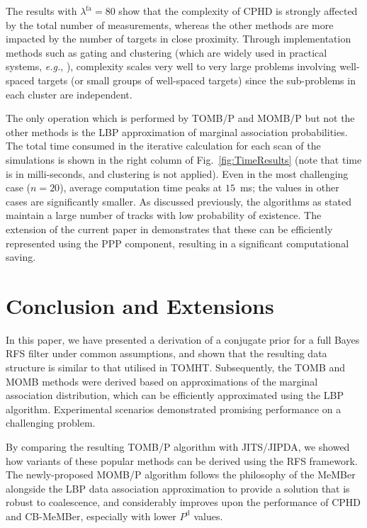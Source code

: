 \documentclass[journal,twoside]{IEEEtran}
\theoremstyle{plain}
\begin{document}
The results with $\lambda^\mathrm{fa}=80$ show that the complexity of CPHD is strongly affected by the total number of measurements, whereas the other methods are more impacted by the number of targets in close proximity. Through implementation methods such as gating and clustering (which are widely used in practical systems, \textit{e.g.}\xspace, \cite{BlaPop99}), complexity scales very well to very large problems involving well-spaced targets (or small groups of well-spaced targets) since the sub-problems in each cluster are independent.

The only operation which is performed by TOMB/P and MOMB/P but not the other methods is the LBP approximation of marginal association probabilities. The total time consumed in the iterative calculation for each scan of the simulations is shown in the right column of Fig.~\ref{fig:TimeResults} (note that time is in milli-seconds, and clustering is not applied). Even in the most challenging case ($n=20$), average computation time peaks at $15$\ ms; the values in other cases are significantly smaller. As discussed previously, the algorithms as stated maintain a large number of tracks with low probability of existence. The extension of the current paper in \cite{Wil12F2} demonstrates that these can be efficiently represented using the PPP component, resulting in a significant computational saving.





\section{Conclusion and Extensions}
\label{sec:Conclusion}
%
In this paper, we have presented a derivation of a conjugate prior for a full Bayes RFS filter under common assumptions, and shown that the resulting data structure is similar to that utilised in TOMHT. Subsequently, the TOMB and MOMB methods were derived based on approximations of the marginal association distribution, which can be efficiently approximated using the LBP algorithm. Experimental scenarios demonstrated promising performance on a challenging problem. 

By comparing the resulting TOMB/P algorithm with JITS/JIPDA, we showed how variants of these popular methods can be derived using the RFS framework. The newly-proposed MOMB/P algorithm follows the philosophy of the MeMBer alongside the LBP data association approximation to provide a solution that is robust to coalescence, and considerably improves upon the performance of CPHD and CB-MeMBer, especially with lower $P^{\mathrm{d}}$ values. 
\end{document}
